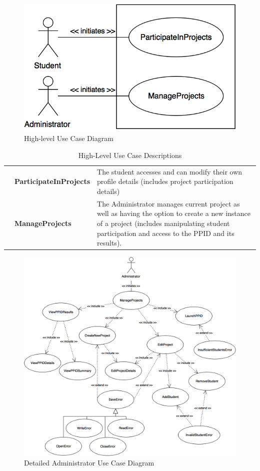\documentclass[12pt,letterpaper]{article}
\begin{document}
\begin{figure}[H]
	\centering{}
	\includegraphics[scale=0.4]{imgs/high-level-use-case-diagram.png}
	\caption{High-level Use Case Diagram}
\end{figure}

\begin{table}[H]
	\caption{High-Level Use Case Descriptions}
	\vspace{1em}
	\begin{tabu} to 
		\participateinprojects{} & ParticipateInProjects & The student accesses and can modify their own profile details 
		(includes project participation details)\\
		\manageprojects{} & ManageProjects & The Administrator manages current project as well as having the option to 
		create a new instance of a project (includes manipulating student participation and access to the PPID and its results). \\
	\end{tabu}
\end{table}

\begin{figure}[H]
	\centering{}
	\includegraphics[scale=0.26]{imgs/detailed-administrator-use-case-diagram.png}
	\caption{Detailed Administrator Use Case Diagram}
\end{figure}
\end{document}
